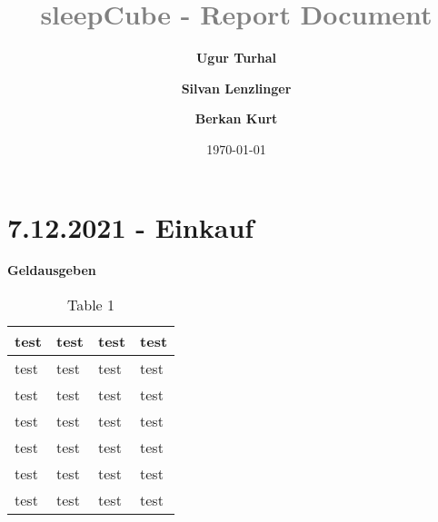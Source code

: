 \documentclass[12pt]{article}
\title{\textcolor{gray}{\textbf{sleepCube - Report Document}\\[0.2cm]}}
\author[1]{\fontsize{9}{9} \textbf{Ugur Turhal}}
\author[2]{\textbf{Silvan Lenzlinger}}
\author[1]{\textbf{Berkan Kurt}}
\affil[1]{\fontsize{8}{8}test}
\affil[2]{test}
\affil[3]{test}
\date{\today}
\begin{document}
\maketitle

\section*{7.12.2021 - Einkauf}
\justifying

\textbf{Geldausgeben} 

\begin{table}[H]
\caption{Table 1}
\begin{tabular}{l|lll}
\hline
test    & test & test & test \\ \hline
test    & test & test & test \\ \hline
test    & test & test & test \\ \hline
test    & test & test & test \\ \hline
test    & test & test & test \\ \hline
test    & test & test & test \\ \hline
test    & test & test & test \\ \hline

\end{tabular}
\label{Tab:table1}
\end{table}
\end{document}
